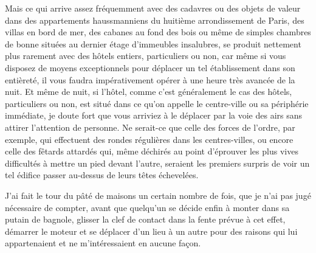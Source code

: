 Mais ce qui arrive assez fréquemment avec des cadavres ou des objets de valeur dans des appartements haussmanniens du huitième arrondissement de Paris, des villas en bord de mer, des cabanes au fond des bois ou même de simples chambres de bonne situées au dernier étage d’immeubles insalubres, se produit nettement plus rarement avec des hôtels entiers, particuliers ou non, car même si vous disposez de moyens exceptionnels pour déplacer un tel établissement dans son entièreté, il vous faudra impérativement opérer à une heure très avancée de la nuit. Et même de nuit, si l’hôtel, comme c’est généralement le cas des hôtels, particuliers ou non, est situé dans ce qu’on appelle le centre-ville ou sa périphérie immédiate, je doute fort que vous arriviez à le déplacer par la voie des airs sans attirer l’attention de personne. Ne serait-ce que celle des forces de l’ordre, par exemple, qui effectuent des rondes régulières dans les centres-villes, ou encore celle des fêtards attardés qui, même déchirés au point d’éprouver les plus vives difficultés à mettre un pied devant l’autre, seraient les premiers surpris de voir un tel édifice passer au-dessus de leurs têtes échevelées.

J’ai fait le tour du pâté de maisons un certain nombre de fois, que je n’ai pas jugé nécessaire de compter, avant que quelqu’un se décide enfin à monter dans sa putain de bagnole, glisser la clef de contact dans la fente prévue à cet effet, démarrer le moteur et se déplacer d’un lieu à un autre pour des raisons qui lui appartenaient et ne m’intéressaient en aucune façon.

